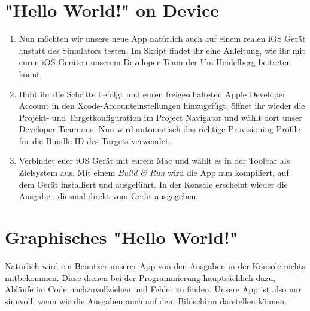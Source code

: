 \documentclass[parskip=half, final]{scrreprt}
\begin{document}
\begin{lecture}
\begin{enumerate}
\end{enumerate}


\section{"Hello World!"{} on Device}

\begin{enumerate}

\item Nun möchten wir unsere neue App natürlich auch auf einem realen iOS Gerät anstatt des Simulators testen. Im Skript findet ihr eine Anleitung, wie ihr mit euren iOS Geräten unserem Developer Team der Uni Heidelberg beitreten könnt.

\item Habt ihr die Schritte befolgt und euren freigeschalteten Apple Developer Account in den Xcode-Accounteinstellungen hinzugefügt, öffnet ihr wieder die Projekt- und Targetkonfiguration im Project Navigator und wählt dort unser Developer Team  aus. Nun wird automatisch das richtige Provisioning Profile für die Bundle ID des Targets verwendet.


\item Verbindet euer iOS Gerät mit eurem Mac und wählt es in der Toolbar als Zielsystem aus. Mit einem \emph{Build \& Run} wird die App nun kompiliert, auf dem Gerät installiert und ausgeführt. In der Konsole erscheint wieder die Ausgabe , diesmal direkt vom Gerät ausgegeben.

\end{enumerate}


\section{Graphisches "{}Hello World!"{}}

Natürlich wird ein Benutzer unserer App von den Ausgaben in der Konsole nichts mitbekommen. Diese dienen bei der Programmierung hauptsächlich dazu, Abläufe im Code nachzuvollziehen und Fehler zu finden. Unsere App ist also nur sinnvoll, wenn wir die Ausgaben auch auf dem Bildschirm darstellen können.



\end{lecture}
\end{document}
